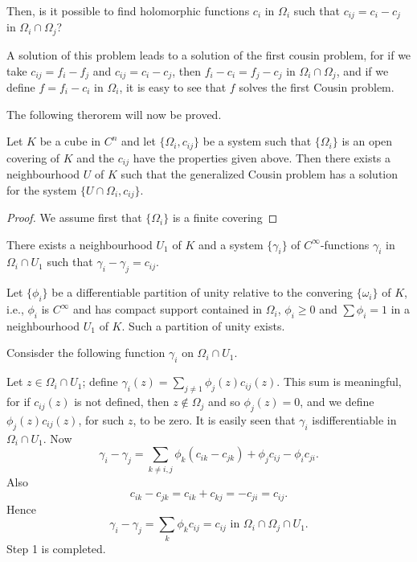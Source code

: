 Then, is it possible to find holomorphic functions $c_i$ in $\Omega_i$
such that $c_{ij} = c_i - c_j$ in $\Omega_i \cap \Omega_j$?

A solution of this problem leads to a solution of the first cousin
problem, for if we take $c_{ij} = f_i - f_j$ and $c_{ij} = c_i - c_j$,
then $f_i - c_i = f_j - c_j$ in $\Omega_i \cap \Omega_j$, and if we
define $f = f_i - c_i$ in $\Omega_i$, it is easy to see that $f$
solves the first Cousin problem. 

\medskip
{}\pageoriginale

The following therorem will now be proved.

\begin{thm}\label{chap8:thm2}
Let $K$ be a cube in $C^n$ and let $\{\Omega_i, c_{ij}\}$ be a system
such that $\{\Omega_i\}$ is an open covering of $K$ and the $c_{ij}$
have the properties given above. Then there exists a neighbourhood $U$
of $K$ such that the generalized Cousin problem has a solution for the
system $\{U \cap \Omega_i, c_{ij}\}$. 
\end{thm}

\begin{proof}
We assume first that $\{\Omega_i\}$ is a finite covering 
\end{proof}

\setcounter{step}{0}
\begin{step}\label{chap8:step1}
There exists a neighbourhood $U_1$ of $K$ and a system $\{\gamma_i\}$
of $C^\infty$-functions $\gamma_i$ in $\Omega_i \cap U_1$ such that
$\gamma_i - \gamma_j = c_{ij}$. 
\end{step}

Let $\{\phi_i\}$ be a differentiable partition of unity relative to
the convering $\{\omega_i\}$ of $K$, i.e., $\phi_i$ is $C^\infty$ and
has compact support contained in $\Omega_i$, $\phi_i \geq 0$ and $\sum
\phi_i =1$ in a neighbourhood $U_1$ of $K$. Such a partition of unity
exists.

Consisder the following function $\gamma_i$ on $\Omega_i \cap U_1$. 

Let $z \in\Omega_i \cap U_1$; define $\gamma_i (z) = \sum\limits_{j
  \neq 1} \phi_j (z) c_{ij} (z)$. This sum is meaningful, for if
$c_{ij}(z)$ is not defined, then $z \not\in \Omega_j$ and so
$\phi_j(z) =0$, and we define $\phi_j(z) c_{ij} (z)$, for such $z$, to
be zero. It is easily seen that $\gamma_i$ isdifferentiable in
$\Omega_i \cap U_1$. Now 
$$
\gamma_i - \gamma_j = \sum\limits_{k \neq i, j} \phi_k (c_{ik} -
c_{jk}) + \phi_j c_{ij} - \phi_i c_{ji}. 
$$
Also
$$
c_{ik} - c_{jk} = c_{ik} + c_{kj} = - c_{ji} = c_{ij}. 
$$
Hence
$$
\gamma_i - \gamma_j = \sum\limits_k \phi_k c_{ij} = c_{ij} \text{ in }
\Omega_i \cap \Omega_j \cap U_1. 
$$
Step 1 is completed. 


